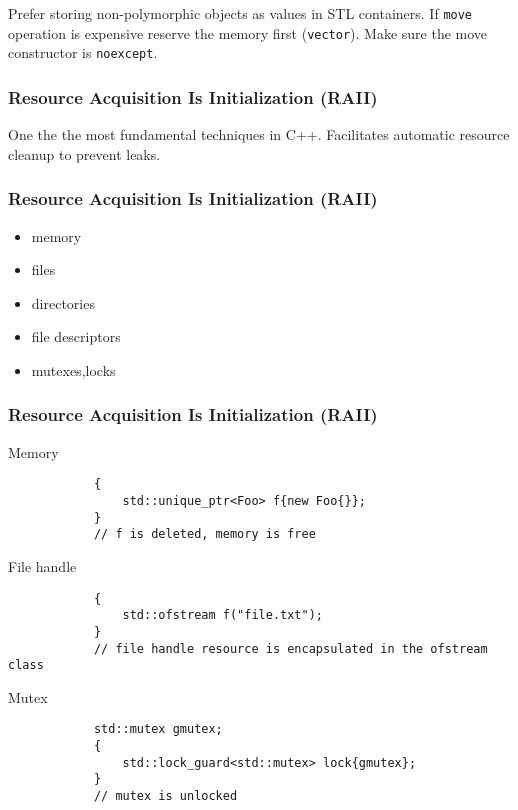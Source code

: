 \documentclass{beamer}
\begin{document}
\begin{frame}
    \begin{center}
    Prefer storing non-polymorphic objects as values in STL containers. \newline \newline
    If \texttt{move} operation is expensive reserve the memory first (\texttt{vector}). \newline \newline
    \pause
    Make sure the move constructor is \texttt{noexcept}.
    \end{center}
\end{frame}

\begin{frame}
\frametitle{Resource Acquisition Is Initialization (RAII)}
    \pause
    \begin{center}
        One the the most fundamental techniques in C++.
        \newline
        Facilitates automatic resource cleanup to prevent leaks.
    \end{center}
\end{frame}
\begin{frame}
\frametitle{Resource Acquisition Is Initialization (RAII)}
    \begin{itemize}
        \item memory
        \item files
        \item directories
        \item file descriptors
        \item mutexes,locks
    \end{itemize}
\end{frame}


\begin{frame}[fragile]
\frametitle{Resource Acquisition Is Initialization (RAII)}
    \pause
    \begin{block}{Memory}
        \begin{lstlisting}
            {
                std::unique_ptr<Foo> f{new Foo{}};
            }
            // f is deleted, memory is free
        \end{lstlisting}
    \end{block}
    
    \pause
    \begin{block}{File handle}
        \begin{lstlisting}
            {
                std::ofstream f("file.txt");
            }
            // file handle resource is encapsulated in the ofstream class
        \end{lstlisting}
    \end{block}

    \pause
    \begin{block}{Mutex}
        \begin{lstlisting}
            std::mutex gmutex;
            {
                std::lock_guard<std::mutex> lock{gmutex};   
            }
            // mutex is unlocked
        \end{lstlisting}
    \end{block}
\end{frame}
\end{document}
